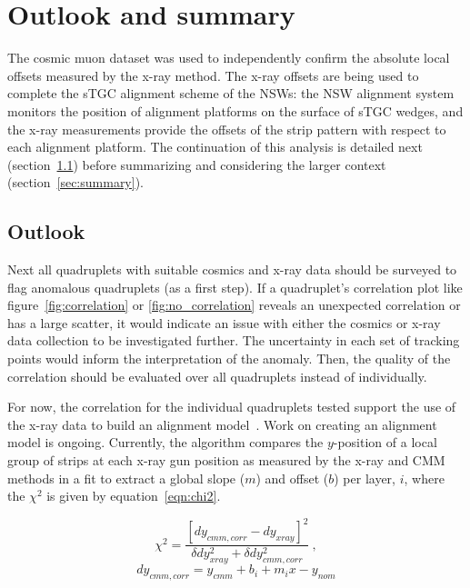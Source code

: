 
\chapter{Outlook and summary}
\label{chap:outlook_and_summary}

The cosmic muon dataset was used to independently confirm the absolute local offsets measured by the x-ray method. The x-ray offsets are being used to complete the sTGC alignment scheme of the NSWs: the NSW alignment system monitors the position of alignment platforms on the surface of sTGC wedges, and the x-ray measurements provide the offsets of the strip pattern with respect to each alignment platform. The continuation of this analysis is detailed next (section~\ref{sec:outlook}) before summarizing and considering the larger context (section~\ref{sec:summary}). 

\section{Outlook}
\label{sec:outlook}

Next all quadruplets with suitable cosmics and x-ray data should be surveyed to flag anomalous quadruplets (as a first step). If a quadruplet's correlation plot like figure~\ref{fig:correlation} or \ref{fig:no_correlation} reveals an unexpected correlation or has a large scatter, it would indicate an issue with either the cosmics or x-ray data collection to be investigated further. The uncertainty in each set of tracking points would inform the interpretation of the anomaly. Then, the quality of the correlation should be evaluated over all quadruplets instead of individually. 
 
For now, the correlation for the individual quadruplets tested support the use of the x-ray data to build an alignment model~\cite{lefebvre_precision_2020}. Work on creating an alignment model is ongoing. Currently, the algorithm compares the $y$-position of a local group of strips at each x-ray gun position as measured by the x-ray and CMM methods in a fit to extract a global slope ($m$) and offset ($b$) per layer, $i$, where the $\chi^2$ is given by equation~\ref{eqn:chi2}.

\begin{equation}
    \chi^2 = \frac{\left[dy_{cmm, corr} - dy_{xray}\right]^2}{\delta dy_{xray}^2 + \delta dy_{cmm, corr}^2}\:,
    \label{eqn:chi2}  
\end{equation}
\begin{equation}
    dy_{cmm, corr} = y_{cmm} + b_i + m_{i}x - y_{nom}
    \label{eqn:dy_cmm_corr}
\end{equation}

